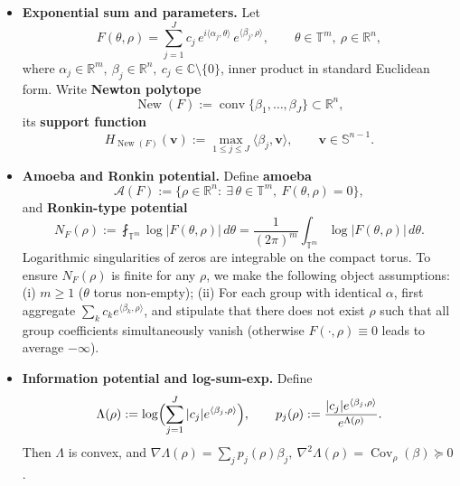 \documentclass[11pt,a4paper]{article}
\theoremstyle{remark}
\DeclareMathOperator{\conv}{conv}
\DeclareMathOperator{\New}{New}
\DeclareMathOperator{\Cov}{Cov}
\begin{document}
\begin{itemize}
\item \textbf{Exponential sum and parameters.} Let
\begin{equation}
F(\theta,\rho)=\sum_{j=1}^J c_j\,e^{i\langle\alpha_j,\theta\rangle}\,e^{\langle\beta_j,\rho\rangle},
\qquad \theta\in\mathbb{T}^m,\ \rho\in\mathbb{R}^n,
\end{equation}
where $\alpha_j\in\mathbb{R}^m,\ \beta_j\in\mathbb{R}^n,\ c_j\in\mathbb{C}\setminus\{0\}$, inner product in standard Euclidean form. Write \textbf{Newton polytope}
\begin{equation}
\New(F):=\conv\{\beta_1,\dots,\beta_J\}\subset\mathbb{R}^n,
\end{equation}
its \textbf{support function}
\begin{equation}
H_{\New(F)}(\mathbf{v}):=\max_{1\le j\le J}\langle\beta_j,\mathbf{v}\rangle,\qquad \mathbf{v}\in\mathbb{S}^{n-1}.
\end{equation}

\item \textbf{Amoeba and Ronkin potential.} Define \textbf{amoeba}
\begin{equation}
\mathcal{A}(F):=\bigl\{\rho\in\mathbb{R}^n:\ \exists\,\theta\in\mathbb{T}^m,\ F(\theta,\rho)=0\bigr\},
\end{equation}
and \textbf{Ronkin-type potential}
\begin{equation}
N_F(\rho):=\fint_{\mathbb{T}^m}\log|F(\theta,\rho)|\,d\theta
=\frac{1}{(2\pi)^m}\int_{\mathbb{T}^m}\log|F(\theta,\rho)|\,d\theta .
\end{equation}
Logarithmic singularities of zeros are integrable on the compact torus. To ensure $N_F(\rho)$ is finite for any $\rho$, we make the following object assumptions:
(i) $m\ge 1$ ($\theta$ torus non-empty);
(ii) For each group with identical $\alpha$, first aggregate $\sum_k c_k e^{\langle\beta_k,\rho\rangle}$, and stipulate that there does not exist $\rho$ such that all group coefficients simultaneously vanish (otherwise $F(\cdot,\rho)\equiv 0$ leads to average $-\infty$).

\item \textbf{Information potential and log-sum-exp.} Define
\begin{equation}
\Lambda(\rho):=\log\Bigl(\sum_{j=1}^J |c_j|e^{\langle\beta_j,\rho\rangle}\Bigr),\qquad
p_j(\rho):=\frac{|c_j|e^{\langle\beta_j,\rho\rangle}}{e^{\Lambda(\rho)}} .
\end{equation}
Then $\Lambda$ is convex, and $\nabla\Lambda(\rho)=\sum_j p_j(\rho)\beta_j,\
\nabla^2\Lambda(\rho)=\Cov_\rho(\beta)\succeq0$.


\end{itemize}
\end{document}
